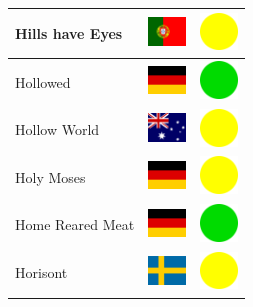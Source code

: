 \documentclass[12pt, a4paper, twoside]{report}
\begin{document}
\begin{center}
\begin{longtable}{|p{5cm}|p{2cm}|p{2cm}|}
 Hills have Eyes                                            & \includegraphics[width=1cm]{../4x3/pt} &   \includegraphics[width=1cm]{../likes/m} \\ \hline
 Hollowed                                                   & \includegraphics[width=1cm]{../4x3/de} &   \includegraphics[width=1cm]{../likes/y} \\ \hline
 Hollow World                                               & \includegraphics[width=1cm]{../4x3/au} &   \includegraphics[width=1cm]{../likes/m} \\ \hline
 Holy Moses                                                 & \includegraphics[width=1cm]{../4x3/de} &   \includegraphics[width=1cm]{../likes/m} \\ \hline
 Home Reared Meat                                           & \includegraphics[width=1cm]{../4x3/de} &   \includegraphics[width=1cm]{../likes/y} \\ \hline
 Horisont                                                   & \includegraphics[width=1cm]{../4x3/se} &   \includegraphics[width=1cm]{../likes/m} \\ \hline

\end{longtable}
\end{center}
\end{document}
